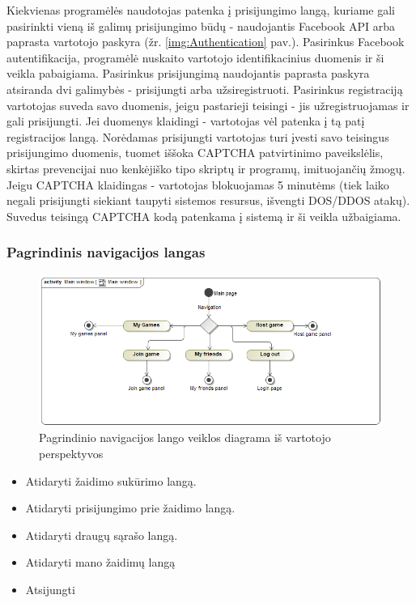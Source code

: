 \documentclass{VUMIFPSkursinis}
\begin{document}
		Kiekvienas programėlės naudotojas patenka į prisijungimo langą, kuriame gali 			pasirinkti vieną iš galimų prisijungimo būdų - naudojantis Facebook API arba 			paprasta vartotojo paskyra (žr. \ref{img:Authentication} pav.). Pasirinkus Facebook autentifikacija, programėlė 			nuskaito vartotojo identifikacinius duomenis ir ši veikla pabaigiama. Pasirinkus 			prisijungimą naudojantis paprasta paskyra atsiranda dvi galimybės - prisijungti 		arba užsiregistruoti. Pasirinkus registraciją vartotojas suveda savo duomenis, 			jeigu pastarieji teisingi - jis užregistruojamas ir gali prisijungti. Jei duomenys 			klaidingi - vartotojas vėl patenka į tą patį registracijos langą. Norėdamas 			prisijungti vartotojas turi įvesti savo teisingus prisijungimo duomenis, tuomet 		iššoka CAPTCHA patvirtinimo paveikslėlis, skirtas prevencijai nuo kenkėjiško tipo 			skriptų ir programų, imituojančių žmogų. Jeigu CAPTCHA klaidingas - vartotojas 			blokuojamas 5 minutėms (tiek laiko negali prisijungti siekiant taupyti sistemos 		resursus, išvengti DOS/DDOS atakų). Suvedus teisingą CAPTCHA kodą patenkama į 			sistemą ir ši veikla užbaigiama.
	\subsubsection{Pagrindinis navigacijos langas}
			\begin{figure}[H]
				\centering
				\includegraphics[scale=0.5]{img/MainWindow_activity}
				\caption{Pagrindinio navigacijos lango veiklos diagrama iš vartotojo perspektyvos}
				\label{img:MainWindow_activity}
			\end{figure}
				\renewcommand{\labelitemi}{$\bullet$}
				\begin{itemize}
					\item Atidaryti žaidimo sukūrimo langą.
					\item Atidaryti prisijungimo prie žaidimo langą.
					\item Atidaryti draugų sąrašo langą.
					\item Atidaryti mano žaidimų langą
					\item Atsijungti
				\end{itemize}
				
\end{document}

